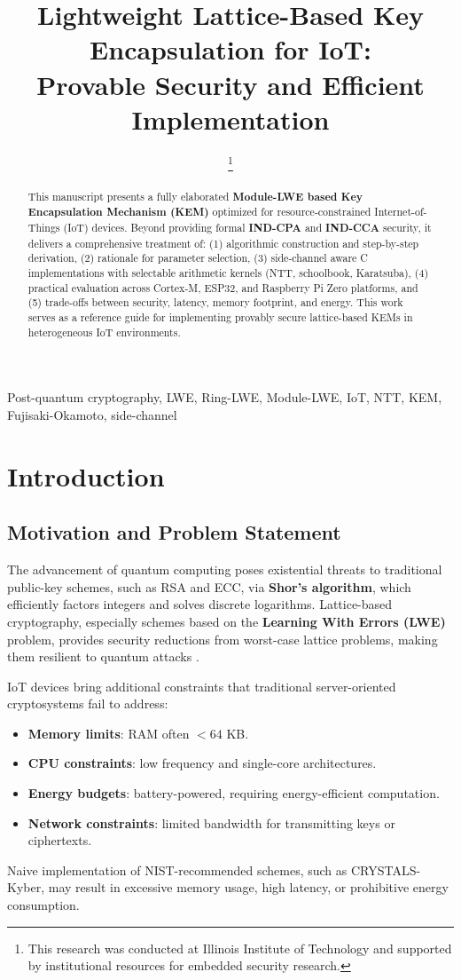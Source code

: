 \documentclass[conference]{IEEEtran}
\title{\Large \bf Lightweight Lattice-Based Key Encapsulation for IoT:\\
Provable Security and Efficient Implementation}
\author{\IEEEauthorblockN{Suproteek Banerjee}
\IEEEauthorblockA{Illinois Institute of Technology\\
bsuproteek@hawk.illinoistech.edu}
\thanks{This research was conducted at Illinois Institute of Technology and supported by institutional resources for embedded security research.}}
\begin{document}
\maketitle

\begin{abstract}
This manuscript presents a fully elaborated \textbf{Module-LWE based Key Encapsulation Mechanism (KEM)} optimized for resource-constrained Internet-of-Things (IoT) devices. Beyond providing formal \textbf{IND-CPA} and \textbf{IND-CCA} security, it delivers a comprehensive treatment of: (1) algorithmic construction and step-by-step derivation, (2) rationale for parameter selection, (3) side-channel aware C implementations with selectable arithmetic kernels (NTT, schoolbook, Karatsuba), (4) practical evaluation across Cortex-M, ESP32, and Raspberry Pi Zero platforms, and (5) trade-offs between security, latency, memory footprint, and energy. This work serves as a reference guide for implementing provably secure lattice-based KEMs in heterogeneous IoT environments.
\end{abstract}

\begin{IEEEkeywords}
Post-quantum cryptography, LWE, Ring-LWE, Module-LWE, IoT, NTT, KEM, Fujisaki-Okamoto, side-channel
\end{IEEEkeywords}

\section{Introduction}
\subsection{Motivation and Problem Statement}
The advancement of quantum computing poses existential threats to traditional public-key schemes, such as RSA and ECC, via \textbf{Shor's algorithm}, which efficiently factors integers and solves discrete logarithms. Lattice-based cryptography, especially schemes based on the \textbf{Learning With Errors (LWE)} problem, provides security reductions from worst-case lattice problems, making them resilient to quantum attacks \cite{Regev05,Peikert16}.

IoT devices bring additional constraints that traditional server-oriented cryptosystems fail to address:
\begin{itemize}
    \item \textbf{Memory limits}: RAM often $<64$ KB.
    \item \textbf{CPU constraints}: low frequency and single-core architectures.
    \item \textbf{Energy budgets}: battery-powered, requiring energy-efficient computation.
    \item \textbf{Network constraints}: limited bandwidth for transmitting keys or ciphertexts.
\end{itemize}
Naive implementation of NIST-recommended schemes, such as CRYSTALS-Kyber, may result in excessive memory usage, high latency, or prohibitive energy consumption.
\end{document}
